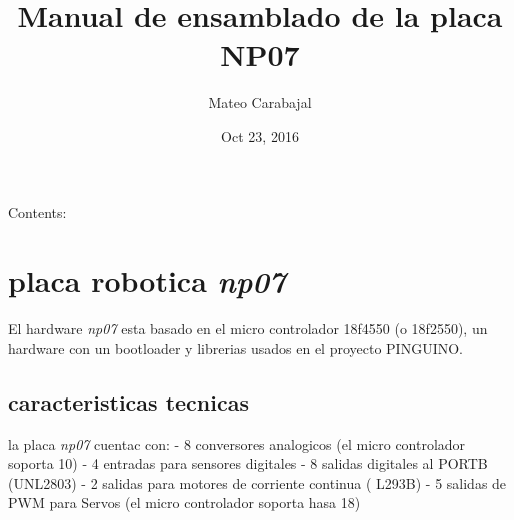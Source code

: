 \documentclass[letterpaper,10pt,english]{sphinxmanual}
\title{Manual de ensamblado de la placa NP07}
\date{Oct 23, 2016}
\author{Mateo Carabajal}
\begin{document}
\maketitle
\tableofcontents
{}\label{index::doc}


Contents:


\chapter{placa robotica \emph{np07}}
\label{np07:placa-robotica-pcb}\label{np07:welcome-to-proyecto-icaro-documentacion-s-documentation}\label{np07::doc}
El hardware \emph{np07} esta basado en el micro controlador 18f4550 (o 18f2550), un
hardware con un bootloader y librerias usados en el proyecto PINGUINO.


\section{caracteristicas tecnicas}
\label{np07:caracteristicas-tecnicas}
la placa \emph{np07} cuentac con:
- 8 conversores analogicos (el micro controlador soporta 10)
- 4 entradas para sensores digitales
- 8 salidas digitales al PORTB (UNL2803)
- 2 salidas para motores de corriente continua ( L293B)
- 5 salidas de PWM para Servos (el micro controlador soporta hasa 18)
\end{document}

